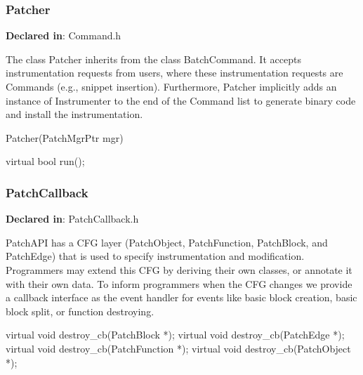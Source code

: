 
\subsubsection{Patcher}
\label{sec-3.2.6}

\textbf{Declared in}: Command.h

The class Patcher inherits from the class BatchCommand. It accepts
instrumentation requests from users, where these instrumentation requests are
Commands (e.g., snippet insertion). Furthermore, Patcher implicitly adds an
instance of Instrumenter to the end of the Command list to generate binary code
and install the instrumentation.


\begin{apient}
Patcher(PatchMgrPtr mgr)
\end{apient}



\begin{apient}
virtual bool run();
\end{apient}



\subsubsection{PatchCallback}
\label{sec-3.2.7}

\textbf{Declared in}: PatchCallback.h

PatchAPI has a CFG layer (PatchObject, PatchFunction, PatchBlock, and PatchEdge)
that is used to specify instrumentation and modification. Programmers may extend
this CFG by deriving their own classes, or annotate it with their own data. To
inform programmers when the CFG changes we provide a callback interface as the
event handler for events like basic block creation, basic block split, or
function destroying.


\begin{apient}
virtual void destroy_cb(PatchBlock *);
virtual void destroy_cb(PatchEdge *);
virtual void destroy_cb(PatchFunction *);
virtual void destroy_cb(PatchObject *);
\end{apient}


